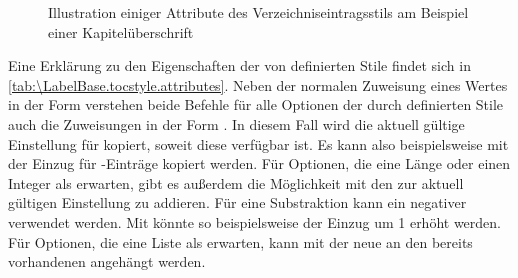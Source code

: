 \begin{description}
\begin{figure}
{%
    }
    \caption{Illustration einiger Attribute des Verzeichniseintragsstils
       am Beispiel einer Kapitelüberschrift}
  \end{figure}
\end{description}
Eine Erklärung zu den Eigenschaften der von  definierten
Stile findet sich in \autoref{tab:\LabelBase.tocstyle.attributes}.
Neben der normalen Zuweisung eines Wertes
in der Form  verstehen beide Befehle
für alle Optionen der durch \KOMAScript{} definierten Stile auch die
Zuweisungen in der Form . In
diesem Fall wird die aktuell gültige Einstellung für 
kopiert, soweit diese verfügbar ist. Es kann also beispielsweise mit
 der Einzug für -Einträge kopiert
werden. Für Optionen, die eine Länge oder einen Integer als 
erwarten, gibt es außerdem die Möglichkeit mit
 den  zur aktuell gültigen
Einstellung zu addieren. Für eine Substraktion kann ein negativer 
verwendet werden. Mit  könnte so beispielsweise der
Einzug um 1 erhöht werden. Für Optionen, die eine
Liste als  erwarten, kann mit
 der neue  an den bereits
vorhandenen angehängt werden.

